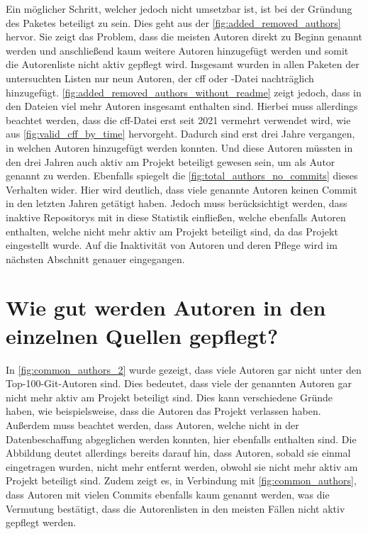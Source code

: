 Ein möglicher Schritt, welcher jedoch nicht umsetzbar ist, ist bei der Gründung des Paketes beteiligt zu sein.
Dies geht aus der \autoref{fig:added_removed_authors} hervor.
Sie zeigt das Problem, dass die meisten Autoren direkt zu Beginn genannt werden und anschließend kaum weitere Autoren hinzugefügt werden und somit die Autorenliste nicht aktiv gepflegt wird.
Insgesamt wurden in allen Paketen der untersuchten Listen nur neun Autoren, der \gls{cff} oder -Datei nachträglich hinzugefügt.
\autoref{fig:added_removed_authors_without_readme} zeigt jedoch, dass in den Dateien viel mehr Autoren insgesamt enthalten sind.
Hierbei muss allerdings beachtet werden, dass die \gls{cff}-Datei erst seit 2021 vermehrt verwendet wird, wie aus \autoref{fig:valid_cff_by_time} hervorgeht.
Dadurch sind erst drei Jahre vergangen, in welchen Autoren hinzugefügt werden konnten.
Und diese Autoren müssten in den drei Jahren auch aktiv am Projekt beteiligt gewesen sein, um als Autor genannt zu werden.
Ebenfalls spiegelt die \autoref{fig:total_authors_no_commits} dieses Verhalten wider.
Hier wird deutlich, dass viele genannte Autoren keinen Commit in den letzten Jahren getätigt haben.
Jedoch muss berücksichtigt werden, dass inaktive Repositorys mit in diese Statistik einfließen, welche ebenfalls Autoren enthalten, welche nicht mehr aktiv am Projekt beteiligt sind, da das Projekt eingestellt wurde.
Auf die Inaktivität von Autoren und deren Pflege wird im nächsten Abschnitt genauer eingegangen.

\section{Wie gut werden Autoren in den einzelnen Quellen gepflegt?}
\label{sec:autoren_pflege_diskussion}
In \autoref{fig:common_authors_2} wurde gezeigt, dass viele Autoren gar nicht unter den Top-100-Git-Autoren sind.
Dies bedeutet, dass viele der genannten Autoren gar nicht mehr aktiv am Projekt beteiligt sind.
Dies kann verschiedene Gründe haben, wie beispielsweise, dass die Autoren das Projekt verlassen haben.
Außerdem muss beachtet werden, dass Autoren, welche nicht in der Datenbeschaffung abgeglichen werden konnten, hier ebenfalls enthalten sind.
Die Abbildung deutet allerdings bereits darauf hin, dass Autoren, sobald sie einmal eingetragen wurden, nicht mehr entfernt werden, obwohl sie nicht mehr aktiv am Projekt beteiligt sind.
Zudem zeigt es, in Verbindung mit \autoref{fig:common_authors}, dass Autoren mit vielen Commits ebenfalls kaum genannt werden, was die Vermutung bestätigt, dass die Autorenlisten in den meisten Fällen nicht aktiv gepflegt werden.

